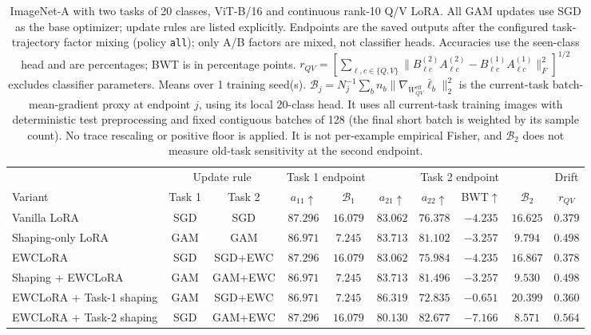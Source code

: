 \begin{table}[t]
\centering\scriptsize
\caption{ImageNet-A with two tasks of 20 classes, ViT-B/16 and continuous rank-10 Q/V LoRA. All GAM updates use SGD as the base optimizer; update rules are listed explicitly. Endpoints are the saved outputs after the configured task-trajectory factor mixing (policy \texttt{all}); only A/B factors are mixed, not classifier heads. Accuracies use the seen-class head and are percentages; BWT is in percentage points. $r_{QV}=\left[\sum_{\ell,c\in\{Q,V\}}\|B^{(2)}_{\ell c}A^{(2)}_{\ell c}-B^{(1)}_{\ell c}A^{(1)}_{\ell c}\|_F^2\right]^{1/2}$ excludes classifier parameters. Means over 1 training seed(s). $\mathcal B_j=N_j^{-1}\sum_b n_b\|\nabla_{W^{\mathrm{eff}}_{QV}}\bar\ell_b\|_2^2$ is the current-task batch-mean-gradient proxy at endpoint $j$, using its local 20-class head. It uses all current-task training images with deterministic test preprocessing and fixed contiguous batches of 128 (the final short batch is weighted by its sample count). No trace rescaling or positive floor is applied. It is not per-example empirical Fisher, and $\mathcal B_2$ does not measure old-task sensitivity at the second endpoint. }
\setlength{\tabcolsep}{2.5pt}
\begin{tabular*}{\textwidth}{@{\extracolsep{\fill}}lccccccccc@{}}
\toprule
& \multicolumn{2}{c}{Update rule} & \multicolumn{2}{c}{Task 1 endpoint} & \multicolumn{4}{c}{Task 2 endpoint} & Drift \\
\cmidrule(lr){2-3}\cmidrule(lr){4-5}\cmidrule(lr){6-9}
Variant & Task 1 & Task 2 & $a_{11}\uparrow$ & $\mathcal B_1$ & $a_{21}\uparrow$ & $a_{22}\uparrow$ & BWT$\uparrow$ & $\mathcal B_2$ & $r_{QV}$ \\
\midrule
Vanilla LoRA & SGD & SGD & $87.296$ & $16.079$ & $83.062$ & $76.378$ & $-4.235$ & $16.625$ & $0.379$ \\
Shaping-only LoRA & GAM & GAM & $86.971$ & $7.245$ & $83.713$ & $81.102$ & $-3.257$ & $9.794$ & $0.498$ \\
EWCLoRA & SGD & SGD+EWC & $87.296$ & $16.079$ & $83.062$ & $75.984$ & $-4.235$ & $16.867$ & $0.378$ \\
Shaping + EWCLoRA & GAM & GAM+EWC & $86.971$ & $7.245$ & $83.713$ & $81.496$ & $-3.257$ & $9.530$ & $0.498$ \\
\midrule
EWCLoRA + Task-1 shaping & GAM & SGD+EWC & $86.971$ & $7.245$ & $86.319$ & $72.835$ & $-0.651$ & $20.399$ & $0.360$ \\
EWCLoRA + Task-2 shaping & SGD & GAM+EWC & $87.296$ & $16.079$ & $80.130$ & $82.677$ & $-7.166$ & $8.571$ & $0.564$ \\
\bottomrule
\end{tabular*}
\end{table}
